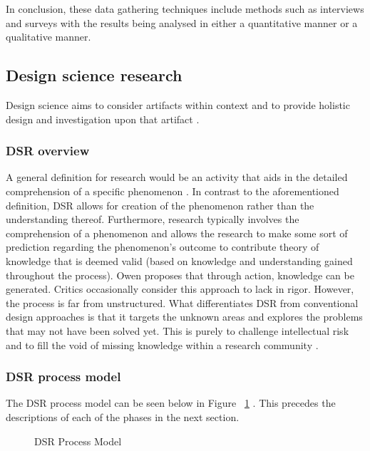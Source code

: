 In conclusion, these data gathering techniques include methods such as interviews and surveys with the results being analysed in either a quantitative manner or a qualitative manner.

\subsection{Design science research}
Design science aims to consider artifacts within context and to provide holistic design and investigation upon that artifact \cite{wieringa2014design}.

\subsubsection{DSR overview}
A general definition for research would be an activity that aids in the detailed comprehension of a specific phenomenon \cite{Vaishnavi2015}. In contrast to the aforementioned definition, DSR allows for creation of the phenomenon rather than the understanding thereof. Furthermore, research typically involves the comprehension of a phenomenon and allows the research to make some sort of prediction regarding the phenomenon’s outcome to contribute theory of knowledge that is deemed valid (based on knowledge and understanding gained throughout the process). Owen \cite{owen1998design} proposes that through action, knowledge can be generated. Critics occasionally consider this approach to lack in rigor. However, the process is far from unstructured.
What differentiates DSR from conventional design approaches is that it targets the unknown areas and explores the problems that may not have been solved yet. This is purely to challenge intellectual risk and to fill the void of missing knowledge within a research community \cite{Vaishnavi2015}.


\subsubsection{DSR process model}
The DSR process model can be seen below in Figure ~\ref{fig:DSR_Process_Model} \cite{Vaishnavi2015}. This precedes the descriptions of each of the phases in the next section.
\begin{figure}[ht]
\centering

\caption{DSR Process Model}
\label{fig:DSR_Process_Model}
\end{figure}

